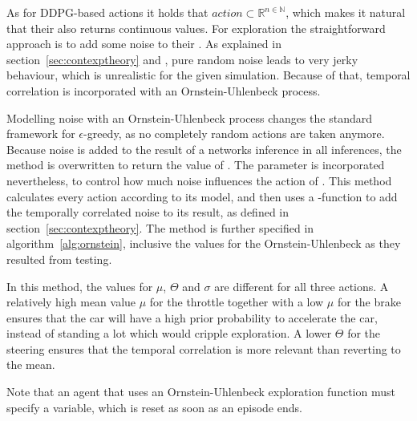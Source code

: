 As for DDPG-based actions it holds that $action \subset \mathds{R}^{n \in \mathds{N}}$, which makes it natural that their  also returns continuous values. For exploration the straightforward approach is to add some noise to their . As explained in section~\ref{sec:contexptheory} and \cite{wawrzynski_control_2015}, pure random noise leads to very jerky behaviour, which is unrealistic for the given simulation. Because of that, temporal correlation is incorporated with an  Ornstein-Uhlenbeck process.

Modelling noise with an Ornstein-Uhlenbeck process changes the standard framework for $\epsilon$-greedy, as no completely random actions are taken anymore. Because noise is added to the result of a networks inference in all inferences, the method  is overwritten to return the value of .  The parameter  is incorporated nevertheless, to control how much noise influences the action of . This method calculates every action according to its model, and then uses a -function to add the temporally correlated noise to its result, as defined in section~\ref{sec:contexptheory}. The method  is further specified in algorithm~\ref{alg:ornstein}, inclusive the values for the Ornstein-Uhlenbeck as they resulted from testing.

In this method, the values for $\mu$, $\Theta$ and $\sigma$ are different for all three actions. A relatively high mean value $\mu$ for the throttle together with a low $\mu$ for the brake ensures that the car will have a high prior probability to accelerate the car, instead of standing a lot which would cripple exploration. A lower $\Theta$ for the steering ensures that the temporal correlation is more relevant than reverting to the mean.

Note that an agent that uses an Ornstein-Uhlenbeck exploration function must specify a  variable, which is reset as soon as an episode ends.

